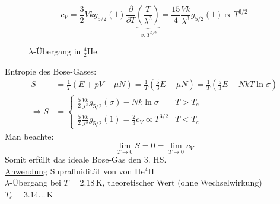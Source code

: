 \begin{enumerate}[A)]
\begin{enumerate}[i)]
        \begin{equation}
            c_V = \frac{3}{2} V k g_{5/2}(1) \frac{\partial}{\partial T} \underbrace{\left( \frac{T}{\lambda^3} \right)}_{\propto T^{5/2}} = \frac{15}{4} \frac{V k }{\lambda^3} g_{5/2}(1) \propto T^{3/2}
        \end{equation}
        \begin{figure}[H]
        \centering
        \def\svgwidth{0.5\textwidth}
        
        \caption{$\lambda$-Übergang in $_2^4$\:\!He.}
        \label{img:LambdaTrans}
\end{figure}
        Entropie des Bose-Gases:
        \begin{equation}
            \begin{split}
                S &= \frac{1}{T} \left( E + pV - \mu N \right) = \frac{1}{T} \left( \frac{5}{3} E - \mu N \right) = \frac{1}{T} \left( \frac{5}{3} E - N k T \ln \sigma \right) \\
                \Rightarrow S &=
                \begin{cases}
                    \frac{5}{2} \frac{V k}{\lambda^3} g_{5/2}(\sigma) - N k \ln \sigma & T > T_c \\
                    \frac{5}{2} \frac{V k}{\lambda^3} g_{5/2}(1) = \frac{2}{3} c_V \propto T^{3/2} & T < T_c
                \end{cases}
            \end{split}
        \end{equation}
        Man beachte:
        \begin{equation}
            \lim_{T \to 0} S = 0 = \lim_{T \to 0} c_V
        \end{equation}
        Somit erfüllt das ideale Bose-Gas den 3. HS. \\
        \underline{Anwendung} Suprafluidität von von He${}^4$II\\
        $\lambda$-Übergang bei $T=2.18\,$K, theoretischer Wert (ohne Wechselwirkung) $T_c = 3.14\ldots\,$K
    \end{enumerate}
\end{enumerate}
